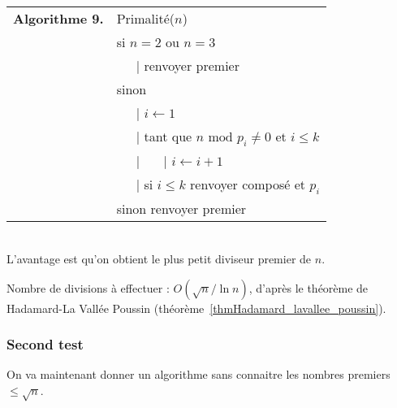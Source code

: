\documentclass[12pt]{report}
\begin{document}
\begin{tabular}{ll}
\textbf{Algorithme 9.} & Primalité($n$)\\
           & si $n=2$ ou $n=3$ \\
           & \ \ \ {\rm | } renvoyer premier  \\
           & sinon \\
           & \ \ \ {\rm |} $i \leftarrow 1$ \\
           & \ \ \ {\rm | } tant que $ n \text{ mod } p_i \neq 0 $ et $i \leq k$  \\
           & \ \ \ {\rm | } \ \ \ {\rm |} $ i \leftarrow i+1$\\ 
           & \ \ \ {\rm | } si $i \leq k$ renvoyer composé et $p_i$  \\    
           & sinon renvoyer premier 
\end{tabular}\\

L'avantage est qu'on obtient le plus petit diviseur premier de $n$.\par 

Nombre de divisions à effectuer : $O (\sqrt{n}/ \ln n)$, d'après le théorème de Hadamard-La Vallée Poussin (théorème~\ref{thmHadamard_lavallee_poussin}).

\subsubsection*{Second test}

On va maintenant donner un algorithme sans connaitre les nombres premiers $\leq \sqrt{n}$.   \\
\end{document}
